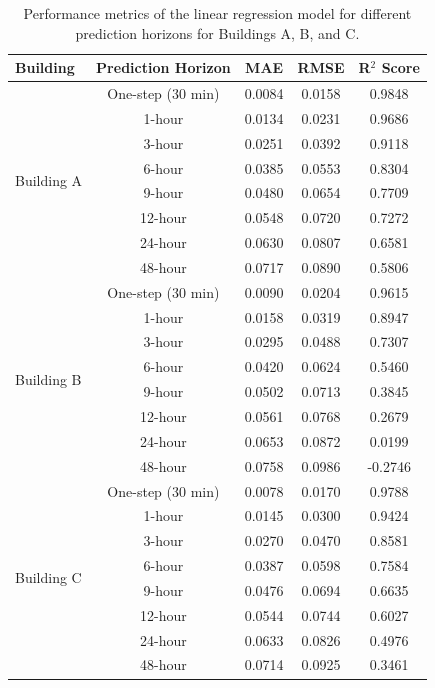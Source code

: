 
\begin{table}[h!]
    \centering
    \caption{Performance metrics of the linear regression model for different prediction horizons for Buildings A, B, and C.}
    \label{tab:prediction_horizons}
    \begin{tabular}{lcccc}
    \hline
    \textbf{Building} & \textbf{Prediction Horizon} & \textbf{MAE} & \textbf{RMSE} & \textbf{R$^2$ Score} \\ \hline
\multirow{8}{*}{Building A}& One-step (30 min) & 0.0084 & 0.0158 & 0.9848 \\
& 1-hour & 0.0134 & 0.0231 & 0.9686 \\
& 3-hour & 0.0251 & 0.0392 & 0.9118 \\
& 6-hour & 0.0385 & 0.0553 & 0.8304 \\
& 9-hour & 0.0480 & 0.0654 & 0.7709 \\
& 12-hour & 0.0548 & 0.0720 & 0.7272 \\
& 24-hour & 0.0630 & 0.0807 & 0.6581 \\
& 48-hour & 0.0717 & 0.0890 & 0.5806 \\
\hline
\multirow{8}{*}{Building B}& One-step (30 min) & 0.0090 & 0.0204 & 0.9615 \\
& 1-hour & 0.0158 & 0.0319 & 0.8947 \\
& 3-hour & 0.0295 & 0.0488 & 0.7307 \\
& 6-hour & 0.0420 & 0.0624 & 0.5460 \\
& 9-hour & 0.0502 & 0.0713 & 0.3845 \\
& 12-hour & 0.0561 & 0.0768 & 0.2679 \\
& 24-hour & 0.0653 & 0.0872 & 0.0199 \\
& 48-hour & 0.0758 & 0.0986 & -0.2746 \\
\hline
\multirow{8}{*}{Building C}& One-step (30 min) & 0.0078 & 0.0170 & 0.9788 \\
& 1-hour & 0.0145 & 0.0300 & 0.9424 \\
& 3-hour & 0.0270 & 0.0470 & 0.8581 \\
& 6-hour & 0.0387 & 0.0598 & 0.7584 \\
& 9-hour & 0.0476 & 0.0694 & 0.6635 \\
& 12-hour & 0.0544 & 0.0744 & 0.6027 \\
& 24-hour & 0.0633 & 0.0826 & 0.4976 \\
& 48-hour & 0.0714 & 0.0925 & 0.3461 \\
\hline

    \end{tabular}
\end{table}
